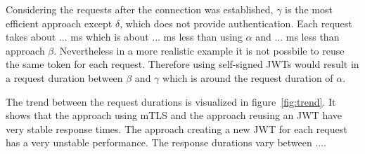 
Considering the requests after the connection was established, $\gamma$ is the most efficient approach except $\delta$, which does not provide authentication.
Each request takes about ... ms which is about ... ms less than using $\alpha$ and ... ms less than approach $\beta$.
Nevertheless in a more realistic example it is not possbile to reuse the same token for each request.
Therefore using self-signed JWTs would result in a request duration between $\beta$ and $\gamma$ which is around the request duration of $\alpha$.

The trend between the request durations is visualized in figure~\ref{fig:trend}.
It shows that the approach using mTLS and the approach reusing an JWT have very stable response times.
The approach creating a new JWT for each request has a very unstable performance.
The response durations vary between ....

